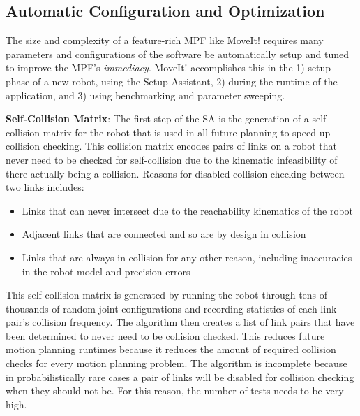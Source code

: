 \documentclass[10pt,journal,compsoc]{joser1}
\begin{document}
{%
\subsection{Automatic Configuration and Optimization}

The size and complexity of a feature-rich MPF like MoveIt! requires many
parameters and configurations of the software be automatically setup and tuned
to improve the MPF's \textit{immediacy}. MoveIt! accomplishes this in the 1)
setup phase of a new robot, using the Setup Assistant, 2) during the runtime of
the application, and 3) using benchmarking and parameter
sweeping\cite{cohen2012generic}.

{\bf Self-Collision Matrix}: The first step of the SA is the generation of a
self-collision matrix for the robot that is used in all future planning to speed
up collision checking. This collision matrix encodes pairs of links on a robot
that never need to be checked for self-collision due to the kinematic
infeasibility of there actually being a collision. Reasons for disabled
collision checking between two links includes:
\begin{itemize}
    \item Links that can never intersect due to the reachability kinematics of
the robot
    \item Adjacent links that are connected and so are by design in collision
    \item Links that are always in collision for any other reason, including
inaccuracies in the robot model and precision errors
\end{itemize}

This self-collision matrix is generated by running the robot through tens of
thousands of random joint configurations and recording statistics of each link
pair's collision frequency. The algorithm then creates a list of link pairs that
have been determined to never need to be collision checked. This reduces future
motion planning runtimes because it reduces the amount of required collision
checks for every motion planning problem. The algorithm is incomplete because in
probabilistically rare cases a pair of links will be disabled for collision
checking when they should not be. For this reason, the number of tests needs to
be very high.

}
\end{document}

